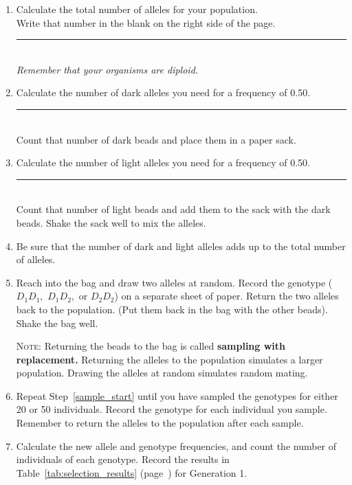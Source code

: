 \documentclass[12pt][hidelinks]{exam}
\newcommand{\allele}[1]{$#1$}
\begin{document}
\begin{enumerate}[resume]
	
	\item \label{total_alleles} Calculate the total number of alleles for your population.\\
	Write that number in the blank on the right side of the page. 
	\hfill \rule{0.5in}{0.4pt}\\ \emph{Remember that your
		organisms are diploid.} 
	
	\item Calculate the number of dark alleles you need for a frequency of 0.50. 
	\hfill \rule{0.5in}{0.4pt} \\ Count that number of dark beads and place 
	them in a paper sack. 
	
	\item Calculate the number of light alleles you need for a frequency of 0.50.
	\hfill \rule{0.5in}{0.4pt} \\ Count that number of light beads and add 
	them to the sack with the dark beads. Shake the sack well to mix the alleles.
	
	\item Be sure that the number of dark and light alleles adds up to the 
	total number of alleles.
	
	
	\item \label{sample_start} Reach into the bag and draw two alleles 
	at random. Record the genotype (\allele{D_1D_1,} \allele{D_1D_2,} or \allele{D_2D_2}) on 
	a separate sheet of paper. Return the two alleles back to the population. 
	(Put them back in the bag with the other beads). Shake the bag well.
	
	\textsc{Note:} Returning the beads to the bag is called \textbf{sampling with replacement.} 
	Returning the alleles to the population simulates a larger population. Drawing 
	the alleles at random simulates random mating.
	
	\item Repeat Step~\ref{sample_start} until you have sampled the genotypes 
	for either 20 or 50 individuals. Record the genotype for each individual you sample. 
	Remember to return the alleles to the population after each sample. 
	
	\item Calculate the new allele and genotype frequencies, and count the number
	of individuals of each genotype. Record the results in Table~\ref{tab:selection_results} (page~\pageref{tab:selection_results}) 
	for Generation 1. 
	
\end{enumerate}
\end{document}
